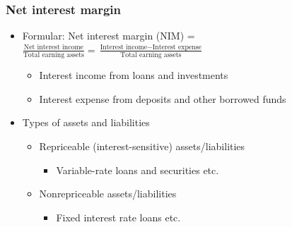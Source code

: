 \subsubsection{Net interest margin}
\begin{itemize}
\item Formular: Net interest margin (NIM) = \(\frac{\text{Net interest income}}{\text{Total earning assets}}=\frac{\text{Interest income}-\text{Interest expense}}{\text{Total earning assets}}\)
    \begin{itemize}
    \item Interest income from loans and investments
    \item Interest expense from deposits and other borrowed funds
    \end{itemize}
    
\item Types of assets and liabilities
    \begin{itemize}
    \item Repriceable (interest-sensitive) assets/liabilities
        \begin{itemize}
        \item Variable-rate loans and securities etc.
        \end{itemize}
    
    \item Nonrepriceable assets/liabilities
        \begin{itemize}
        \item Fixed interest rate loans etc.
        \end{itemize}
    
    \end{itemize}
    

\end{itemize}
